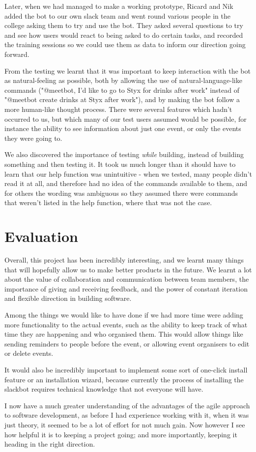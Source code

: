 \documentclass[12pt]{report}
\begin{document}
Later, when we had managed to make a working prototype, Ricard and Nik added the bot to our own slack team and went round various people in the college asking them to try and use the bot. They asked several questions to try and see how users would react to being asked to do certain tasks, and recorded the training sessions so we could use them as data to inform our direction going forward.

From the testing we learnt that it was important to keep interaction with the bot as natural-feeling as possible, both by allowing the use of natural-language-like commands ("@meetbot, I'd like to go to Styx for drinks after work" instead of "@meetbot create drinks at Styx after work"), and by making the bot follow a more human-like thought process. There were several features which hadn't occurred to us, but which many of our test users assumed would be possible, for instance the ability to see information about just one event, or only the events they were going to.

We also discovered the importance of testing \emph{while} building, instead of building something and then testing it. It took us much longer than it should have to learn that our help function was unintuitive - when we tested, many people didn't read it at all, and therefore had no idea of the commands available to them, and for others the wording was ambiguous so they assumed there were commands that weren't listed in the help function, where that was not the case.

\section{Evaluation}\label{evaluation}
Overall, this project has been incredibly interesting, and we learnt many things that will hopefully allow us to make better products in the future. We learnt a lot about the value of collaboration and communication between team members, the importance of giving and receiving feedback, and the power of constant iteration and flexible direction in building software.

Among the things we would like to have done if we had more time were adding more functionality to the actual events, such as the ability to keep track of what time they are happening and who organised them. This would allow things like sending reminders to people before the event, or allowing event organisers to edit or delete events.

It would also be incredibly important to implement some sort of one-click install feature or an installation wizard, because currently the process of installing the slackbot requires technical knowledge that not everyone will have.

I now have a much greater understanding of the advantages of the agile approach to software development, as before I had experience working with it, when it was just theory, it seemed to be a lot of effort for not much gain. Now however I see how helpful it is to keeping a project going; and more importantly, keeping it heading in the right direction.
\end{document}
